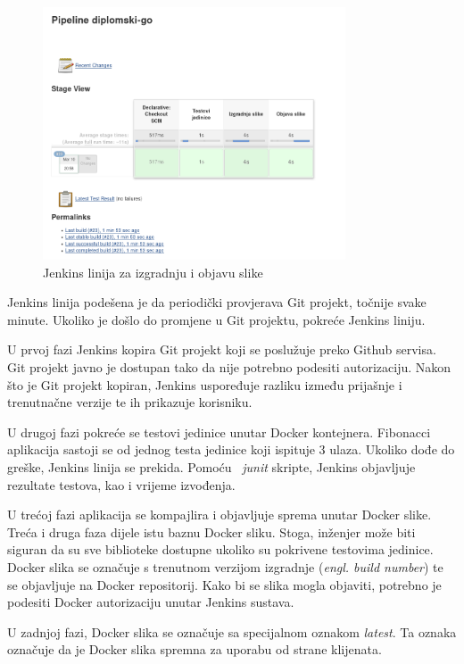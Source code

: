 \begin{figure}
    \centering
    \includegraphics[width=0.8\textwidth]{img/03/jenkins_pipeline.png}
    \caption{Jenkins linija za izgradnju i objavu slike}%
    \label{fig:03jenkins_pipeline}
\end{figure}

Jenkins linija podešena je da periodički provjerava Git projekt, točnije svake minute. Ukoliko je
došlo do promjene u Git projektu, pokreće Jenkins liniju.

U prvoj fazi Jenkins kopira Git projekt koji se poslužuje preko Github servisa. Git projekt javno je
dostupan tako da nije potrebno podesiti autorizaciju. Nakon što je Git projekt kopiran, Jenkins
uspoređuje razliku između prijašnje i trenutnačne verzije te ih prikazuje korisniku.

U drugoj fazi pokreće se testovi jedinice unutar Docker kontejnera. Fibonacci aplikacija sastoji se
od jednog testa jedinice koji ispituje 3 ulaza. Ukoliko dođe do greške, Jenkins linija se prekida.
Pomoću ~\textit{junit} skripte, Jenkins objavljuje rezultate testova, kao i vrijeme izvođenja.

U trećoj fazi aplikacija se kompajlira i objavljuje sprema unutar Docker slike. Treća i druga faza
dijele istu baznu Docker sliku. Stoga, inženjer može biti siguran da su sve biblioteke dostupne
ukoliko su pokrivene testovima jedinice. Docker slika se označuje s trenutnom verzijom izgradnje
(\textit{engl. build number}) te se objavljuje na Docker repositorij. Kako bi se slika mogla
objaviti, potrebno je podesiti Docker autorizaciju unutar Jenkins sustava.

U zadnjoj fazi, Docker slika se označuje sa specijalnom oznakom \textit{latest}. Ta oznaka označuje
da je Docker slika spremna za uporabu od strane klijenata.

